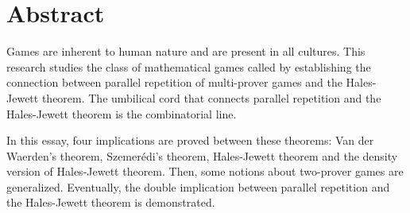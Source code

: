 
\chapter*{Abstract} 

Games are inherent to  human nature and are present in all cultures. This research studies the class of mathematical games  called  
by establishing the connection between parallel repetition of multi-prover games and the Hales-Jewett theorem. The umbilical cord that connects parallel repetition and the Hales-Jewett theorem is the combinatorial line.

In this essay,
four implications are proved between these theorems: Van der Waerden's theorem, Szemerédi's theorem, Hales-Jewett theorem and the density version of Hales-Jewett theorem. Then,  some notions about  two-prover games
are  generalized. Eventually, the double implication between parallel repetition and the Hales-Jewett theorem is 
demonstrated.






